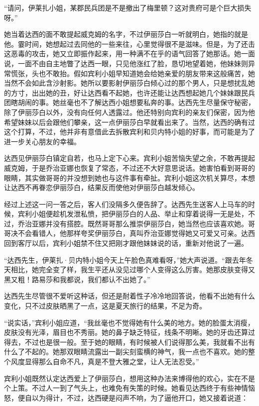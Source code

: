 \par “请问，伊莱扎小姐，某郡民兵团是不是撤出了梅里顿？这对贵府可是个巨大损失呀。”
\par 她当着达西的面不敢提起威克姆的名字，不过伊丽莎白一听就明白，她指的就是他。霎时间，她想起过去同他的一些来往，心里觉得很不是滋味。但是，为了还击这恶毒的攻击，她又立即振作起来，用一种满不在乎的语气回答了她那话。她一面说，一面不由自主地瞥了达西一眼，只见他涨红了脸，恳切地望着她，他妹妹则异常慌张，头也不敢抬。假如宾利小姐早知道她会给她亲爱的朋友带来这般痛苦，她当然不会如此含沙射影。她所以要影射伊丽莎白倾心过的那个男人，只是想扰乱她的方寸，出出她的丑，好让达西看不起她，也许还能让达西想起她几个妹妹跟民兵团瞎胡闹的事。她丝毫也不了解达西小姐想要私奔的事。达西先生尽量保守秘密，除了伊丽莎白以外，没有向任何人透露过。他还特别向宾利的亲友们保密，因为他希望妹妹以后会跟他们攀亲，这一点伊丽莎白早就看出来了。当然，达西的确有过这个打算，不过，他并非有意借此去拆散宾利和贝内特小姐的好事，而可能是为了进一步关心朋友的幸福。
\par 达西见伊丽莎白镇定自若，也马上定下心来。宾利小姐苦恼失望之余，不敢再提起威克姆，于是乔治亚娜也恢复了常态，不过还不大好意思说话。她害怕看到哥哥的眼睛，其实做哥哥的并没想到她也与这件事有牵扯。宾利小姐这次机关算尽，本想让达西不再眷恋伊丽莎白，结果反而使他对伊丽莎白越发倾心。
\par 经过上述这一问一答之后，客人们没隔多久便告辞了。达西先生送客人上马车的时候，宾利小姐便趁机发泄私愤，把伊丽莎白的人品、举止和穿着说得一无是处，不过，乔治亚娜并没有搭腔。既然哥哥那么推崇伊丽莎白，她当然也应该喜欢她。哥哥决不会看错人，他那样夸奖伊丽莎白，真叫乔治亚娜觉得她又可爱又可亲。达西回到客厅以后，宾利小姐禁不住又把刚才跟他妹妹说的话，重新对他说了一遍。
\par “达西先生，伊莱扎·贝内特小姐今天上午脸色真难看呀，”她大声说道。“跟去年冬天相比，她完全变了样，我生平还从没见过哪个人变得这么厉害。她那皮肤变得又黑又粗！路易莎和我都说，我们都认不出她了。”
\par 达西先生尽管很不爱听这种话，但还是耐着性子冷冷地回答说，他看不出她有什么变化，只不过皮肤晒黑了一点，这是夏天旅行的结果，不足为奇。
\par “说实话，”宾利小姐应道，“我丝毫也不觉得她有什么美的地方。她的脸蛋太消瘦，皮肤没有光泽，眉目也不秀丽。她的鼻子缺乏特征，线条不明晰。她的牙齿还算过得去，不过也是很一般。至于她的眼睛，有时候被人们说得那么美，我就看不出有什么了不起的。她那双眼睛流露出一副尖刻蛮横的神气，我一点也不喜欢。她的整个风度显得那么自命不凡，真是不登大雅之堂，让人无法忍受。”
\par 宾利小姐既然认定达西爱上了伊丽莎白，想用这种办法来博得他的欢心，实在不是个上策。不过人一到了气头上，也难免有失策的时候。她看见达西终于有些神情恼怒，便自以为得计，不过，达西硬是闷声不响，为了逼他开口，她又接着说道：
